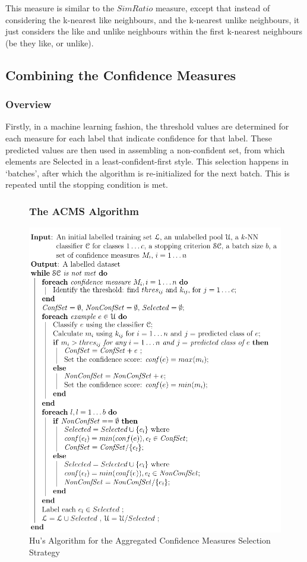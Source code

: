 \documentclass[a4paper,11pt]{report}
\begin{document}
This measure is similar to the $SimRatio$ measure, except that instead of considering the k-nearest like neighbours, and the k-nearest unlike neighbours, it just considers the like and unlike neighbours within the first k-nearest neighbours (be they like, or unlike).

\subsection{Combining the Confidence Measures}

\subsubsection{Overview}
Firstly, in a machine learning fashion, the threshold values are determined for each measure for each label that indicate confidence for that label. These predicted values are then used in assembling a non-confident set, from which elements are Selected in a least-confident-first style. This selection happens in `batches', after which the algorithm is re-initialized for the next batch. This is repeated until the stopping condition is met.

\begin{figure}[h!] 
\subsubsection{The ACMS Algorithm}
\centering
\includegraphics[scale=0.75]{./Others/Hu2011AggregrateAlgorithm}
\caption*{Hu's Algorithm for the Aggregated Confidence Measures Selection Strategy}
\end{figure}
\end{document}
